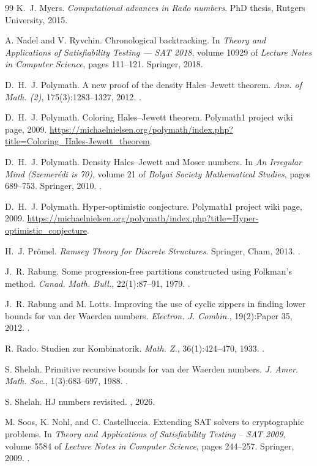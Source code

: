 \documentclass[12pt]{article}
\begin{document}
\begin{thebibliography}{99}
K.~J. Myers. \emph{Computational advances in {Rado} numbers}. PhD
thesis, Rutgers University, 2015.

A. Nadel and V. Ryvchin. Chronological backtracking. In \emph{Theory
and Applications of Satisfiability Testing --- SAT 2018}, volume 10929
of \emph{Lecture Notes in Computer Science}, pages 111--121. Springer,
2018.

D.~H.~J. Polymath. A new proof of the density Hales--Jewett theorem.
\emph{Ann. of Math. (2)}, 175(3):1283--1327, 2012.
.

D.~H.~J. Polymath. Coloring Hales--Jewett theorem. Polymath1 project
wiki page, 2009.
\url{https://michaelnielsen.org/polymath/index.php?title=Coloring_Hales-Jewett_theorem}.

D.~H.~J. Polymath. Density Hales--Jewett and Moser numbers. In
\emph{An Irregular Mind (Szemer\'edi is 70)}, volume 21 of
\emph{Bolyai Society Mathematical Studies}, pages 689--753. Springer,
2010. .

D.~H.~J. Polymath. Hyper-optimistic conjecture. Polymath1 project wiki
page, 2009.
\url{https://michaelnielsen.org/polymath/index.php?title=Hyper-optimistic_conjecture}.

H.~J. Pr\"omel. \emph{Ramsey Theory for Discrete Structures}. Springer,
Cham, 2013. .

J.~R. Rabung. Some progression-free partitions constructed using
Folkman's method. \emph{Canad. Math. Bull.}, 22(1):87--91, 1979.
.

J.~R. Rabung and M. Lotts. Improving the use of cyclic zippers in
finding lower bounds for van der Waerden numbers. \emph{Electron. J.
Combin.}, 19(2):Paper 35, 2012. .

R. Rado. Studien zur Kombinatorik. \emph{Math. Z.}, 36(1):424--470,
1933. .

S. Shelah. Primitive recursive bounds for van der Waerden numbers.
\emph{J. Amer. Math. Soc.}, 1(3):683--697, 1988.
.

S. Shelah. HJ numbers revisited. , 2026.

M. Soos, K. Nohl, and C. Castelluccia. Extending {SAT} solvers to
cryptographic problems. In \emph{Theory and Applications of
Satisfiability Testing -- SAT 2009}, volume 5584 of \emph{Lecture
Notes in Computer Science}, pages 244--257. Springer, 2009.
.


\end{thebibliography}
\end{document}
